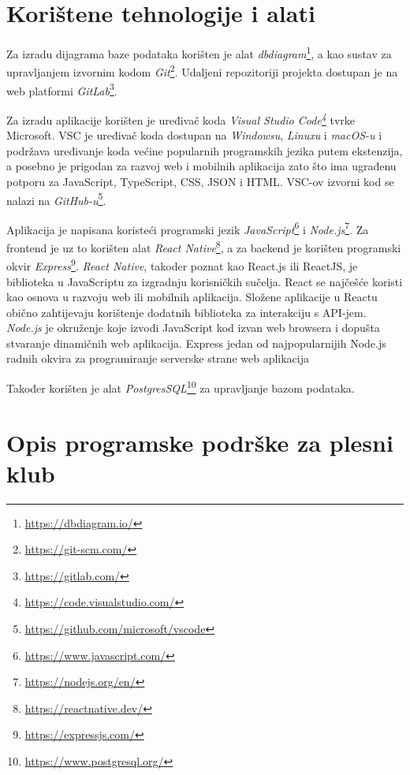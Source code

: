 \documentclass[times, utf8, zavrsni]{fer}
\begin{document}
	
	
        \pagebreak
        
\chapter{Korištene tehnologije i alati}
		
			 Za izradu dijagrama baze podataka korišten je alat \textit{dbdiagram}\footnote{\url{https://dbdiagram.io/}}, a kao sustav za upravljanjem izvornim kodom \textit{Git}\footnote{\url{https://git-scm.com/}}. Udaljeni repozitoriji projekta dostupan je na web platformi \textit{GitLab}\footnote{\url{https://gitlab.com/}}.
			 
			Za izradu aplikacije korišten je uređivač koda \textit{Visual Studio Code\footnote{\url{https://code.visualstudio.com/}}} tvrke Microsoft. VSC je uređivač koda dostupan na  \textit{Windowsu},  \textit{Linuxu} i  \textit{macOS-u} i podržava uređivanje koda većine popularnih programskih jezika putem ekstenzija, a posebno je prigodan za razvoj web i mobilnih aplikacija zato što ima ugrađenu potporu za JavaScript, TypeScript, CSS, JSON i HTML. VSC-ov izvorni kod se nalazi na  \textit{GitHub-u}\footnote{\url{https://github.com/microsoft/vscode}}.
			 
			 
			 Aplikacija je napisana koristeći programski jezik \textit{JavaScript}\footnote{\url{https://www.javascript.com/}} i \textit{Node.js}\footnote{\url{https://nodejs.org/en/}}. Za frontend je uz to korišten alat \textit{React Native}\footnote{\url{https://reactnative.dev/}}, a za backend je korišten programski okvir \textit{Express}\footnote{\url{https://expressjs.com/}}. \textit{React Native}, takoder
            poznat kao React.js ili ReactJS, je biblioteka u JavaScriptu za izgradnju korisničkih sučelja. React se najčešće koristi kao osnova u razvoju web ili mobilnih aplikacija. Složene aplikacije u Reactu obično zahtijevaju korištenje dodatnih biblioteka za interakciju s API-jem. \textit{Node.js} je okruženje koje izvodi JavaScript kod izvan web browsera i dopušta stvaranje dinamičnih web aplikacija.  Express jedan od najpopularnijih Node.js radnih okvira za programiranje serverske strane web aplikacija
			 
			 
			 Također korišten je alat \textit{PostgresSQL}\footnote{\url{https://www.postgresql.org/}} za upravljanje bazom podataka.
			
			
			\pagebreak 

\chapter{Opis programske podrške za plesni klub}    
\end{document}
